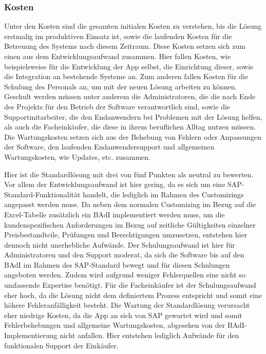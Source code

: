 \subsubsection{Kosten}

Unter den Kosten sind die gesamten initialen Kosten zu verstehen, bis die Lösung erstmalig im produktiven Einsatz ist, sowie die laufenden Kosten für die Betreuung des Systems nach diesem Zeitraum. Diese Kosten setzen sich zum einen aus dem Entwicklungsaufwand zusammen. Hier fallen Kosten, wie beispielsweise für die Entwicklung der App selbst, die Einrichtung dieser, sowie die Integration an bestehende Systeme an. Zum anderen fallen Kosten für die Schulung des Personals an, um mit der neuen Lösung arbeiten zu können. Geschult werden müssen unter anderem die Administratoren, die die nach Ende des Projekts für den Betrieb der Software verantwortlich sind, sowie die Supportmitarbeiter, die den Endanwendern bei Problemen mit der Lösung helfen, als auch die Facheinkäufer, die diese in ihrem beruflichen Alltag nutzen müssen. Die Wartungskosten setzen sich aus der Behebung von Fehlern oder Anpassungen der Software, den laufenden Endanwendersupport und allgemeinen Wartungskosten, wie Updates, etc. zusammen.

Hier ist die Standardlösung mit drei von fünf Punkten als neutral zu bewerten. Vor allem der Entwicklungsaufwand ist hier gering, da es sich um eine SAP-Standard-Funktionalität handelt, die lediglich im Rahmen des Customizings angepasst werden muss. Da neben dem normalen Customizing im Bezug auf die Excel-Tabelle zusätzlich ein BAdI implementiert werden muss, um die kundenspezifischen Anforderungen im Bezug auf zeitliche Gültigkeiten einzelner Preisbestandteile, Prüfungen und Berechtigungen umzusetzen, entstehen hier dennoch nicht unerhebliche Aufwände. Der Schulungsaufwand ist hier für Administratoren und den Support moderat, da sich die Software bis auf den BAdI im Rahmen des SAP-Standard bewegt und für diesen Schulungen angeboten werden. Zudem wird aufgrund weniger Fehlerquellen eine nicht so umfassende Expertise benötigt. Für die Facheinkäufer ist der Schulungsaufwand eher hoch, da die Lösung nicht dem definiertem Prozess entspricht und somit eine höhere Fehleranfälligkeit besteht. Die Wartung der Standardlösung verursacht eher niedrige Kosten, da die App an sich von SAP gewartet wird und somit Fehlerbehebungen und allgemeine Wartungskosten, abgesehen von der BAdI-Implementierung nicht anfallen. Hier entstehen lediglich Aufwände für den funktionalen Support der Einkäufer.

